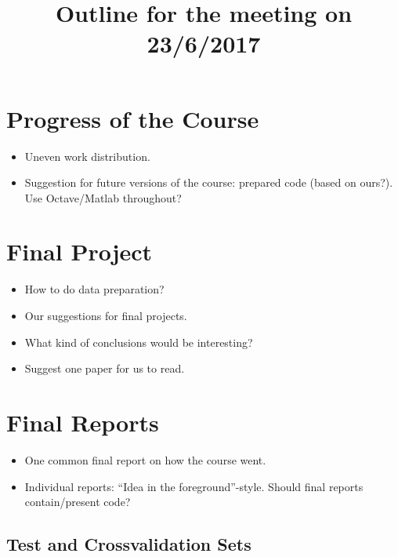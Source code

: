 \documentclass[•]{article}
\title{Outline for the meeting on 23/6/2017}
\begin{document}
\maketitle
\section{Progress of the Course}
\begin{itemize}
\item Uneven work distribution.
\item Suggestion for future versions of the course: prepared code (based on ours?). Use Octave/Matlab throughout?

\end{itemize}
\section{Final Project}
\begin{itemize}
\item How to do data preparation?
\item Our suggestions for final projects.
\item What kind of conclusions would be interesting?
\item Suggest one paper for us to read.

\end{itemize}

\section{Final Reports}
\begin{itemize}
\item One common final report on how the course went.
\item Individual reports:
\subitem ``Idea in the foreground''-style.
\subitem Should final reports contain/present code?
\end{itemize}

\subsection{Test and Crossvalidation Sets}
\end{document}
